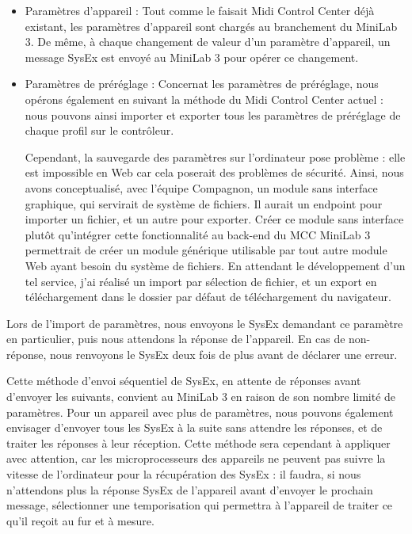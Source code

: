 \documentclass[francais]{rapportPFE}  %
\begin{document}
\begin{itemize}
    \item Paramètres d'appareil :  Tout comme le faisait Midi Control Center déjà existant, les paramètres d'appareil sont chargés au branchement du MiniLab 3. De même, à chaque changement de valeur d'un paramètre d'appareil, un message SysEx est envoyé au MiniLab 3 pour opérer ce changement.
    \item Paramètres de préréglage : Concernat les paramètres de préréglage, nous opérons également en suivant la méthode du Midi Control Center actuel : nous pouvons ainsi importer et exporter tous les paramètres de préréglage de chaque profil sur le contrôleur. 
    
    Cependant, la sauvegarde des paramètres sur l'ordinateur pose problème : elle est impossible en Web car cela poserait des problèmes de sécurité. Ainsi, nous avons conceptualisé, avec l'équipe Compagnon, un module sans interface graphique, qui servirait de système de fichiers. Il aurait un endpoint pour importer un fichier, et un autre pour exporter. Créer ce module sans interface plutôt qu'intégrer cette fonctionnalité au back-end du MCC MiniLab 3 permettrait de créer un module générique utilisable par tout autre module Web ayant besoin du système de fichiers. En attendant le développement d'un tel service, j'ai réalisé un import par sélection de fichier, et un export en téléchargement dans le dossier par défaut de téléchargement du navigateur.
\end{itemize}

Lors de l'import de paramètres, nous envoyons le SysEx demandant ce paramètre en particulier, puis nous attendons la réponse de l'appareil. En cas de non-réponse, nous renvoyons le SysEx deux fois de plus avant de déclarer une erreur.

Cette méthode d'envoi séquentiel de SysEx, en attente de réponses avant d'envoyer les suivants, convient au MiniLab 3 en raison de son nombre limité de paramètres. Pour un appareil avec plus de paramètres, nous pouvons également envisager d'envoyer tous les SysEx à la suite sans attendre les réponses, et de traiter les réponses à leur réception. Cette méthode sera cependant à appliquer avec attention, car les microprocesseurs des appareils ne peuvent pas suivre la vitesse de l'ordinateur pour la récupération des SysEx : il faudra, si nous n'attendons plus la réponse SysEx de l'appareil avant d'envoyer le prochain message, sélectionner une temporisation qui permettra à l'appareil de traiter ce qu'il reçoit au fur et à mesure.
\end{document}
